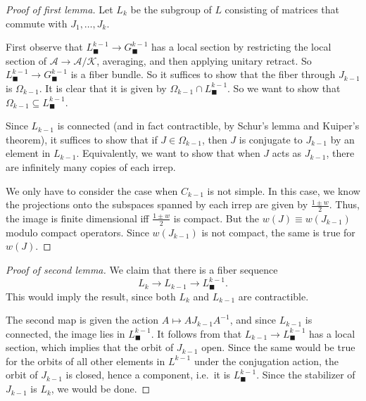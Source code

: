 \documentclass{shortart}
\theoremstyle{definition}
\begin{document}
\begin{proof}[Proof of first lemma]
  Let $L_k$ be the subgroup of $L$ consisting of matrices that commute with $J_1, \ldots, J_k$.
  
  First observe that $L^{k - 1}_\blacksquare \to G^{k - 1}_{\blacksquare}$ has a local section by restricting the local section of $\mathcal{A} \to \mathcal{A}/\mathcal{K}$, averaging, and then applying unitary retract. So $L_\blacksquare^{k -1 } \to G_{\blacksquare}^{k - 1}$ is a fiber bundle. So it suffices to show that the fiber through $J_{k - 1}$ is $\Omega_{k - 1}$. It is clear that it is given by $\Omega_{k - 1} \cap L^{k - 1}_{\blacksquare}$. So we want to show that $\Omega_{k - 1} \subseteq L^{k - 1}_{\blacksquare}$.

  Since $L_{k - 1}$ is connected (and in fact contractible, by Schur's lemma and Kuiper's theorem), it suffices to show that if $J \in \Omega_{k - 1}$, then $J$ is conjugate to $J_{k - 1}$ by an element in $L_{k - 1}$. Equivalently, we want to show that when $J$ acts as $J_{k - 1}$, there are infinitely many copies of each irrep.

  We only have to consider the case when $C_{k - 1}$ is not simple. In this case, we know the projections onto the subspaces spanned by each irrep are given by $\frac{1 \pm w}{2}$. Thus, the image is finite dimensional iff $\frac{1 \pm w}{2}$ is compact. But the $w(J) \equiv w(J_{k - 1})$ modulo compact operators. Since $w(J_{k - 1})$ is not compact, the same is true for $w(J)$.
\end{proof}
\begin{proof}[Proof of second lemma]
  We claim that there is a fiber sequence
  \[
    L_k \to L_{k - 1} \to L_\blacksquare^{k - 1}.
  \]
  This would imply the result, since both $L_k$ and $L_{k - 1}$ are contractible.

  The second map is given the action $A \mapsto AJ_{k - 1} A^{-1}$, and since $L_{k - 1}$ is connected, the image lies in $L_{\blacksquare}^{k - 1}$. It follows from \cite[Theorem 6]{bartlegraves52} that $L_{k - 1} \to L^{k - 1}_\blacksquare$ has a local section, which implies that the orbit of $J_{k - 1}$ open. Since the same would be true for the orbits of all other elements in $L^{k - 1}$ under the conjugation action, the orbit of $J_{k - 1}$ is closed, hence a component, i.e.\ it is $L^{k - 1}_\blacksquare$. Since the stabilizer of $J_{k - 1}$ is $L_k$, we would be done.
\end{proof}
\end{document}
